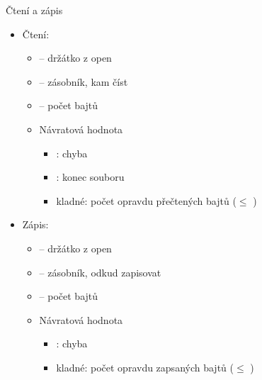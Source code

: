 \begin{frame}{Čtení a zápis}

  \begin{itemize}
    \item Čtení: 
    \begin{itemize}
      \item {} -- držátko z open
      \item {} -- zásobník, kam číst
      \item {} -- počet bajtů
      \item Návratová hodnota
      \begin{itemize}
	\item {}: chyba
	\item {}: konec souboru
	\item kladné: počet opravdu přečtených bajtů ($\leq$ )
      \end{itemize}
    \end{itemize}

    \pause

    \item Zápis: 
    \begin{itemize}
      \item {} -- držátko z open
      \item {} -- zásobník, odkud zapisovat
      \item {} -- počet bajtů
      \item Návratová hodnota
      \begin{itemize}
	\item {}: chyba
	\item kladné: počet opravdu zapsaných bajtů ($\leq$ )
      \end{itemize}
    \end{itemize}
  \end{itemize}

\end{frame}

